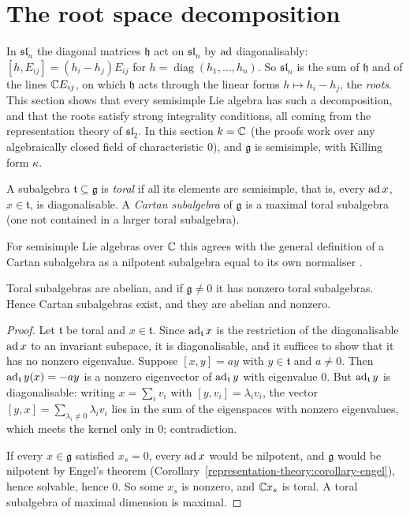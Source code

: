 \section{The root space decomposition}\label{representation-theory:section-roots}

In $\mathfrak{sl}_n$ the diagonal matrices $\mathfrak{h}$ act on $\mathfrak{sl}_n$ by $\operatorname{ad}$ diagonalisably: $[h, E_{ij}] = (h_i - h_j)E_{ij}$ for $h = \operatorname{diag}(h_1, \ldots,
h_n)$. So $\mathfrak{sl}_n$ is the sum of $\mathfrak{h}$ and of the lines $\mathbb{C} E_{ij}$, on which $\mathfrak{h}$ acts through the linear forms $h \mapsto h_i - h_j$, the
\emph{roots}. This section shows that every semisimple Lie algebra has such a decomposition, and that the roots satisfy strong integrality conditions, all coming from the
representation theory of $\mathfrak{sl}_2$. In this section $k = \mathbb{C}$ (the proofs work over any algebraically closed field of characteristic $0$), and $\mathfrak{g}$ is semisimple,
with Killing form $\kappa$.

\begin{definition}\label{representation-theory:definition-toral}
A subalgebra $\mathfrak{t} \subseteq \mathfrak{g}$ is \emph{toral} if all its elements are semisimple, that is, every $\operatorname{ad} x$, $x \in \mathfrak{t}$, is diagonalisable. A
\emph{Cartan subalgebra} of $\mathfrak{g}$ is a maximal toral subalgebra (one not contained in a larger toral subalgebra).
\end{definition}

For semisimple Lie algebras over $\mathbb{C}$ this agrees with the general definition of a Cartan subalgebra as a nilpotent subalgebra equal to its own normaliser
\cite[Section 15]{humphreys-lie}.

\begin{lemma}\label{representation-theory:lemma-toral}
Toral subalgebras are abelian, and if $\mathfrak{g} \neq 0$ it has nonzero toral subalgebras. Hence Cartan subalgebras exist, and they are abelian and nonzero.
\end{lemma}

\begin{proof}
Let $\mathfrak{t}$ be toral and $x \in \mathfrak{t}$. Since $\operatorname{ad}_{\mathfrak{t}}x$ is the restriction of the diagonalisable $\operatorname{ad} x$ to an invariant subspace, it is diagonalisable,
and it suffices to show that it has no nonzero eigenvalue. Suppose $[x, y] = ay$ with $y \in \mathfrak{t}$ and $a \neq 0$. Then $\operatorname{ad}_{\mathfrak{t}}y(x) = -ay$ is a nonzero
eigenvector of $\operatorname{ad}_{\mathfrak{t}}y$ with eigenvalue $0$. But $\operatorname{ad}_{\mathfrak{t}}y$ is diagonalisable: writing $x = \sum_iv_i$ with $[y, v_i] = \lambda_iv_i$, the vector
$[y, x] = \sum_{\lambda_i \neq 0}\lambda_iv_i$ lies in the sum of the eigenspaces with nonzero eigenvalues, which meets the kernel only in $0$; contradiction.

If every $x \in \mathfrak{g}$ satisfied $x_s = 0$, every $\operatorname{ad} x$ would be nilpotent, and $\mathfrak{g}$ would be nilpotent by Engel's theorem
(Corollary~\ref{representation-theory:corollary-engel}), hence solvable, hence $0$. So some $x_s$ is nonzero, and $\mathbb{C} x_s$ is toral. A toral subalgebra of maximal dimension is maximal.
\end{proof}

